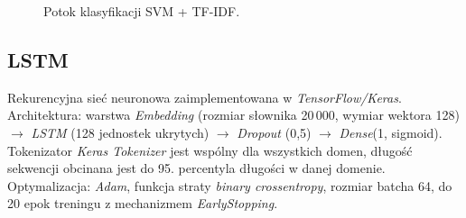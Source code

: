 \documentclass[runningheads]{llncs}
\begin{document}
\begin{figure}[h]
\centering
{}
\caption{Potok klasyfikacji SVM + TF-IDF.}
\end{figure}

\subsection*{LSTM}
Rekurencyjna sieć neuronowa zaimplementowana w \textit{TensorFlow/Keras}. Architektura: warstwa \textit{Embedding} (rozmiar słownika 20\,000, wymiar wektora 128) $\rightarrow$ \textit{LSTM} (128 jednostek ukrytych) $\rightarrow$ \textit{Dropout} (0,5) $\rightarrow$ \textit{Dense}(1, sigmoid). Tokenizator \textit{Keras Tokenizer} jest wspólny dla wszystkich domen, długość sekwencji obcinana jest do 95. percentyla długości w danej domenie. Optymalizacja: \textit{Adam}, funkcja straty \textit{binary crossentropy}, rozmiar batcha 64, do 20 epok treningu z mechanizmem \textit{EarlyStopping}.
\end{document}
